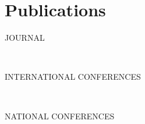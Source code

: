 \chapter*{Publications}


\begin{refsection}[ownpubs]

    \noindent JOURNAL
    \small
    \nocite{soule2024journal}
    \printbibliography[keyword=journal, heading=none]

    \

    \noindent INTERNATIONAL CONFERENCES
    \small
    \nocite{soule2024marl}
    \nocite{soulej2023sim}
    \printbibliography[keyword=international, heading=none]

    \

    \noindent NATIONAL CONFERENCES
    \nocite{soule2023jfsmathese}
    \nocite{soule2023ressithese}
    \nocite{soule2023rjciathese}
    \nocite{soule2024outil}
    \nocite{soule2024approche}
    \printbibliography[keyword=national, heading=none]

\end{refsection}
